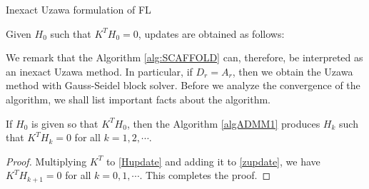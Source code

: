 \begin{algorithm}
\caption{Inexact Uzawa formulation of FL}\label{algADMMx} 
Given $H_0$ such that $K^TH_0 = 0$, updates are obtained as follows:  
\begin{algorithmic}
\EndFor
\end{algorithmic}
\end{algorithm}

We remark that the Algorithm \ref{alg:SCAFFOLD} can, therefore, be interpreted as an inexact Uzawa method. In particular, if $D_r = A_r$, then we obtain the  Uzawa method with Gauss-Seidel block solver. Before we analyze the convergence of the algorithm, we shall list important facts about the algorithm. 
\begin{lemma}
If $H_0$ is given so that $K^TH_0$, then the Algorithm \ref{algADMM1} produces $H_k$ such that $K^TH_k = 0$ for all $k = 1,2,\cdots$. 
\end{lemma}
\begin{proof} 
Multiplying $K^T$ to \eqref{Hupdate} and adding it to \eqref{zupdate}, we have $K^T H_{k+1} = 0$ for all $k = 0,1,\cdots$. 
This completes the proof. 
\end{proof} 

